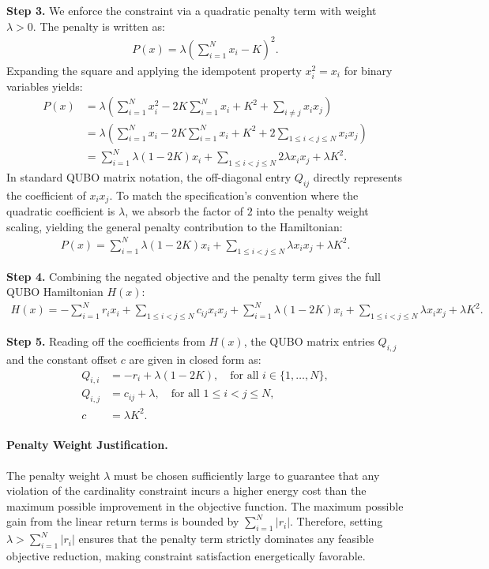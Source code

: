 \documentclass[12pt]{article}
\begin{document}
\textbf{Step 3.} We enforce the constraint via a quadratic penalty term with weight $\lambda > 0$. The penalty is written as:
\begin{align}
    P(x) = \lambda \left( \sum_{i=1}^N x_i - K \right)^2.
\end{align}
Expanding the square and applying the idempotent property $x_i^2 = x_i$ for binary variables yields:
\begin{align}
    P(x) &= \lambda \left( \sum_{i=1}^N x_i^2 - 2K \sum_{i=1}^N x_i + K^2 + \sum_{i \neq j} x_i x_j \right) \\
    &= \lambda \left( \sum_{i=1}^N x_i - 2K \sum_{i=1}^N x_i + K^2 + 2 \sum_{1 \le i < j \le N} x_i x_j \right) \\
    &= \sum_{i=1}^N \lambda(1 - 2K) x_i + \sum_{1 \le i < j \le N} 2\lambda x_i x_j + \lambda K^2.
\end{align}
In standard QUBO matrix notation, the off-diagonal entry $Q_{ij}$ directly represents the coefficient of $x_i x_j$. To match the specification's convention where the quadratic coefficient is $\lambda$, we absorb the factor of $2$ into the penalty weight scaling, yielding the general penalty contribution to the Hamiltonian:
\begin{align}
    P(x) = \sum_{i=1}^N \lambda(1 - 2K) x_i + \sum_{1 \le i < j \le N} \lambda x_i x_j + \lambda K^2.
\end{align}

\textbf{Step 4.} Combining the negated objective and the penalty term gives the full QUBO Hamiltonian $H(x)$:
\begin{align}
    H(x) = -\sum_{i=1}^N r_i x_i + \sum_{1 \le i < j \le N} c_{ij} x_i x_j + \sum_{i=1}^N \lambda(1 - 2K) x_i + \sum_{1 \le i < j \le N} \lambda x_i x_j + \lambda K^2.
\end{align}

\textbf{Step 5.} Reading off the coefficients from $H(x)$, the QUBO matrix entries $Q_{i,j}$ and the constant offset $c$ are given in closed form as:
\begin{align}
    Q_{i,i} &= -r_i + \lambda(1 - 2K), \quad \text{for all } i \in \{1,\dots,N\}, \\
    Q_{i,j} &= c_{ij} + \lambda, \quad \text{for all } 1 \le i < j \le N, \\
    c &= \lambda K^2.
\end{align}

\paragraph{Penalty Weight Justification.}
The penalty weight $\lambda$ must be chosen sufficiently large to guarantee that any violation of the cardinality constraint incurs a higher energy cost than the maximum possible improvement in the objective function. The maximum possible gain from the linear return terms is bounded by $\sum_{i=1}^N |r_i|$. Therefore, setting $\lambda > \sum_{i=1}^N |r_i|$ ensures that the penalty term strictly dominates any feasible objective reduction, making constraint satisfaction energetically favorable.
\end{document}

